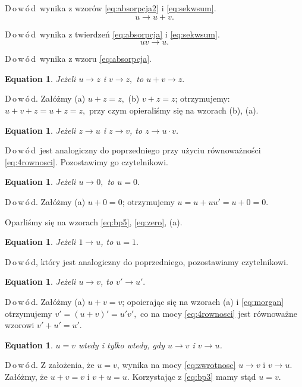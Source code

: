 \documentclass[12 pt, a4paper, leqno]{book}
\numberwithin{equation}{section}
\newcommand{\dowod}{D\,o\,w\,ó\,d}
\theoremstyle{twr}
\theoremstyle{twr}
\theoremstyle{eqtext}
\newtheorem{eqtext}[equation]{Equation}
\theoremstyle{okreslenie}
\begin{document}
\dowod \ wynika z wzorów \eqref{eq:absorpcja2} i \eqref{eq:sekwsum}.
\begin{equation}
u \rightarrow u + v.
\end{equation}

\dowod \ wynika z twierdzeń \eqref{eq:absorpcja} i \eqref{eq:sekwsum}.
\begin{equation}
  uv \rightarrow u.
\end{equation}

\dowod \ wynika z wzoru \eqref{eq:absorpcja}.
\begin{eqtext}
\itshape Jeżeli $u \rightarrow z$ i  $v \rightarrow z,$ to  $u + v \rightarrow z.$
\end{eqtext}

\dowod. Załóżmy (a) $u + z = z,$ (b) $v + z = z$; otrzymujemy: $u + v + z = u + z = z,$ przy czym opieraliśmy się na wzorach (b), (a).
\begin{eqtext}
\itshape Jeżeli $z \rightarrow u$ i $z \rightarrow v$, to $z \rightarrow u\cdot v$.
\end{eqtext}

\dowod \ jest analogiczny do poprzedniego przy użyciu równoważności \eqref{eq:4rownosci}. Pozostawimy go czytelnikowi.
\begin{eqtext}
\itshape Jeżeli $u \rightarrow 0,$ to $u = 0$.
\end{eqtext}

\dowod. Załóżmy (a) $u + 0 = 0$; otrzymujemy $u = u + uu' = u + 0 = 0.$

Oparliśmy się na wzorach \eqref{eq:bp5}, \eqref{eq:zero}, (a).
\begin{eqtext}
\itshape Jeżeli $1 \rightarrow u$, to $u = 1.$
\end{eqtext}

\dowod, który jest analogiczny do poprzedniego, pozostawiamy czytelnikowi.
\begin{eqtext}
\itshape Jeżeli $u \rightarrow v$, to $v' \rightarrow u'.$
\end{eqtext}

\dowod. Załóżmy (a) $u + v = v$; opoierając się na wzorach (a) i \eqref{eq:morgan} otrzymujemy $v' = (u + v)' = u'v',$ co na mocy \eqref{eq:4rownosci}
jest równoważne wzorowi $v' + u' = u'.$
\begin{eqtext}
  \itshape $u = v$ wtedy i tylko wtedy, gdy $u \rightarrow v$ i $v \rightarrow u$.
\end{eqtext}

\dowod. Z założenia, że $u = v$, wynika na mocy \eqref{eq:zwrotnosc} $u \rightarrow v$ i $v \rightarrow u$. Załóżmy, że $u + v = v$ i $v + u = u$. Korzystając
z \eqref{eq:bp3} mamy stąd $u=v.$
\end{document}
